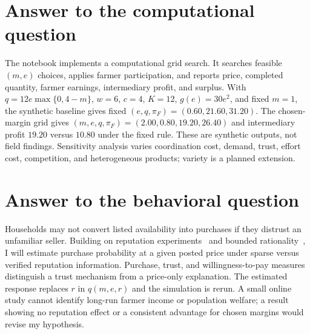 \section{Answer to the computational question}
The notebook implements a computational grid search. It searches feasible $(m,e)$ choices, applies farmer participation, and reports price, completed quantity, farmer earnings, intermediary profit, and surplus. With $q=12e\max\{0,4-m\}$, $w=6$, $c=4$, $K=12$, $g(e)=30e^2$, and fixed $m=1$, the synthetic baseline gives fixed $(e,q,\pi_F)=(0.60,21.60,31.20)$. The chosen-margin grid gives $(m,e,q,\pi_F)=(2.00,0.80,19.20,26.40)$ and intermediary profit $19.20$ versus $10.80$ under the fixed rule. These are synthetic outputs, not field findings. Sensitivity analysis varies coordination cost, demand, trust, effort cost, competition, and heterogeneous products; variety is a planned extension.

\clearpage\balance
\section{Answer to the behavioral question}
Households may not convert listed availability into purchases if they distrust an unfamiliar seller. Building on reputation experiments~\cite{resnick2006} and bounded rationality~\cite{simon1955}, I will estimate purchase probability at a given posted price under sparse versus verified reputation information. Purchase, trust, and willingness-to-pay measures distinguish a trust mechanism from a price-only explanation. The estimated response replaces $r$ in $q(m,e,r)$ and the simulation is rerun. A small online study cannot identify long-run farmer income or population welfare; a result showing no reputation effect or a consistent advantage for chosen margins would revise my hypothesis.

